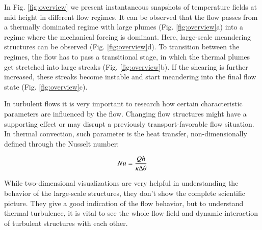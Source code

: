 \documentclass[final,5p,times,twocolumn]{elsarticle}
\begin{document}
In Fig. \ref{fig:overview} we present instantaneous snapshots of temperature
fields at mid height in different flow regimes. It can be observed that the flow passes from a
thermally dominated regime with large plumes (Fig. \ref{fig:overview}a) into a
regime where the mechanical forcing is dominant. Here, large-scale meandering
structures can be observed (Fig. \ref{fig:overview}d). To transition between the
regimes, the flow has to pass a transitional stage, in which the thermal plumes
get stretched into large streaks (Fig. \ref{fig:overview}b). If the shearing is
further increased, these streaks become instable and start meandering into the
final flow state (Fig. \ref{fig:overview}c).

In turbulent flows it is very important to research how certain characteristic
parameters are influenced by the flow. Changing flow structures might have a
supporting effect or may disrupt a previously transport-favorable flow situation. 
In thermal convection, such parameter is the heat transfer, non-dimensionally
defined through the Nusselt number:

\begin{equation} %
Nu= \frac{Qh}{\kappa \Delta \theta}
\label{eqn:nusselt} \\[8pt]
\end{equation} 



While two-dimensional visualizations are very helpful in understanding the behavior of the large-scale structures, they don't show the complete scientific picture. They give a good indication of the flow behavior, but to understand thermal turbulence, it is vital to see the whole flow field and dynamic interaction of turbulent structures with each other. 
\end{document}
